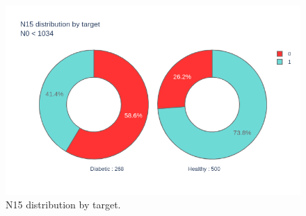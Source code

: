 \documentclass[12pt]{article}
\begin{document}
\begin{figure}[ht]
\centering
\includegraphics[width=1\textwidth]{newplot(41).png}
\caption{\label{fig:48} N15 distribution by target.}
\end{figure}

\clearpage
\newpage
\end{document}
